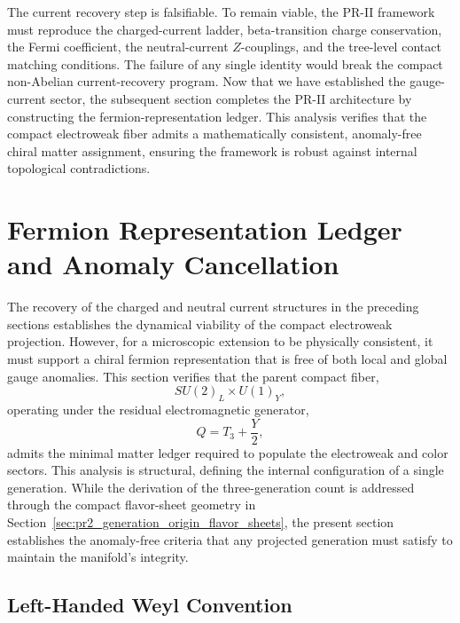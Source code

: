 \documentclass[11pt]{article}
\begin{document}
The current recovery step is falsifiable. To remain viable, the PR-II framework must reproduce the charged-current ladder, beta-transition charge conservation, the Fermi coefficient, the neutral-current $Z$-couplings, and the tree-level contact matching conditions. The failure of any single identity would break the compact non-Abelian current-recovery program. 
Now that we have established the gauge-current sector, the subsequent section completes the PR-II architecture by constructing the fermion-representation ledger. This analysis verifies that the compact electroweak fiber admits a mathematically consistent, anomaly-free chiral matter assignment, ensuring the framework is robust against internal topological contradictions.

\section{Fermion Representation Ledger and Anomaly Cancellation}
\label{sec:pr2_fermion_representation_anomaly_cancellation}

The recovery of the charged and neutral current structures in the preceding sections establishes the dynamical viability of the compact electroweak projection. However, for a microscopic extension to be physically consistent, it must support a chiral fermion representation that is free of both local and global gauge anomalies. This section verifies that the parent compact fiber,
\begin{equation}
SU(2)_L \times U(1)_Y,
\end{equation}
operating under the residual electromagnetic generator,
\begin{equation}
Q = T_3 + \frac{Y}{2},
\end{equation}
admits the minimal matter ledger required to populate the electroweak and color sectors. This analysis is structural, defining the internal configuration of a single generation. While the derivation of the three-generation count is addressed through the compact flavor-sheet geometry in Section~\ref{sec:pr2_generation_origin_flavor_sheets}, the present section establishes the anomaly-free criteria that any projected generation must satisfy to maintain the manifold's integrity.

\subsection{Left-Handed Weyl Convention}
\label{sec:pr2_left_handed_weyl_convention}
\end{document}
